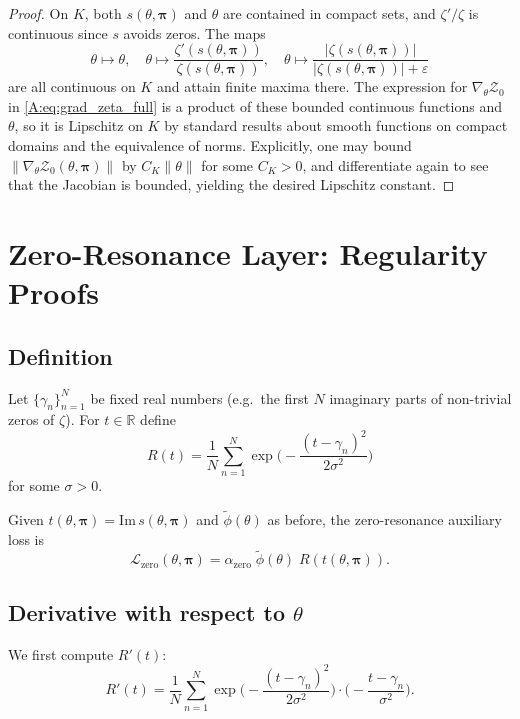 \documentclass[11pt]{article}
\begin{document}
\begin{proof}
On $K$, both $s(\theta,\bm{\pi})$ and $\theta$ are contained in compact sets, and $\zeta'/\zeta$ is continuous since $s$ avoids zeros. The maps
\[
  \theta \mapsto \theta, \quad
  \theta \mapsto \frac{\zeta'(s(\theta,\bm{\pi}))}{\zeta(s(\theta,\bm{\pi}))}, \quad
  \theta \mapsto \frac{|\zeta(s(\theta,\bm{\pi}))|}
                     {|\zeta(s(\theta,\bm{\pi}))|+\varepsilon}
\]
are all continuous on $K$ and attain finite maxima there. The expression for $\nabla_\theta\mathcal{Z}_0$ in \eqref{A:eq:grad_zeta_full} is a product of these bounded continuous functions and $\theta$, so it is Lipschitz on $K$ by standard results about smooth functions on compact domains and the equivalence of norms. Explicitly, one may bound $\|\nabla_\theta\mathcal{Z}_0(\theta,\bm{\pi})\|$ by $C_K\|\theta\|$ for some $C_K>0$, and differentiate again to see that the Jacobian is bounded, yielding the desired Lipschitz constant.
\end{proof}

\section{Zero-Resonance Layer: Regularity Proofs}

\subsection{Definition}

Let $\{\gamma_n\}_{n=1}^N$ be fixed real numbers (e.g.\ the first $N$ imaginary parts of non-trivial zeros of $\zeta$). For $t\in\mathbb{R}$ define
\[
  R(t) = \frac{1}{N}\sum_{n=1}^N \exp\bigg(-\frac{(t-\gamma_n)^2}{2\sigma^2}\bigg)
\]
for some $\sigma>0$.

Given $t(\theta,\bm{\pi}) = \mathrm{Im}\,s(\theta,\bm{\pi})$ and $\tilde{\phi}(\theta)$ as before, the zero-resonance auxiliary loss is
\[
  \mathcal{L}_{\mathrm{zero}}(\theta,\bm{\pi})
   = \alpha_{\mathrm{zero}}\;\tilde{\phi}(\theta)\; R(t(\theta,\bm{\pi})).
\]

\subsection{Derivative with respect to $\theta$}

We first compute $R'(t)$:
\[
  R'(t) = \frac{1}{N}\sum_{n=1}^N
    \exp\bigg(-\frac{(t-\gamma_n)^2}{2\sigma^2}\bigg)\cdot
    \bigg(-\frac{t-\gamma_n}{\sigma^2}\bigg).
\]
\end{document}

